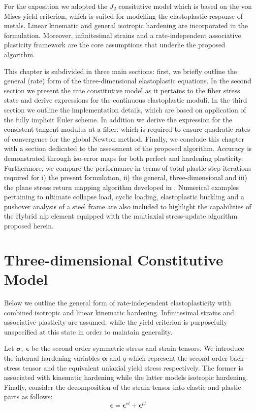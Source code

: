 For the exposition we adopted the $J_2$ consitutive model which is based on the 
von Mises yield criterion, which is suited for modelling the elastoplastic 
response of metals. Linear kinematic and general isotropic hardening are 
incorporated in the formulation. Moreover, infinitesimal strains and a 
rate-independent associative plasticity framework are the core assumptions that 
underlie the proposed algorithm. 

This chapter is subdivided in three main 
sections: first, we briefly outline the general (rate) form of the 
three-dimensional elastoplastic equations. In the second section we present the 
rate constitutive model as it pertains to the fiber stress state and derive 
expressions for the continuous elastoplastic moduli. In the third 
section we outline the implementation details, which are based on application 
of the fully implicit Euler scheme. In addition we derive the expression for 
the consistent tangent modulus at a fiber, which is required to ensure 
quadratic rates of convergence for the global Newton method. Finally, we 
conclude this chapter with a section dedicated to the assessment of the 
proposed algorithm. Accuracy is demonstrated through iso-error maps for both 
perfect and hardening plasticity. Furthermore, we compare the performance in 
terms of total plastic step iterations required for i) the present formulation, 
ii) the general, three-dimensional and iii) the plane stress return mapping 
algorithm developed in \cite{Simo1986}. Numerical examples pertaining to 
ultimate collapse load, cyclic loading, elastoplastic buckling and a pushover 
analysis of a steel frame are also included to highlight the capabilities of 
the Hybrid \acrshort{nlp} element equipped with the multiaxial stress-update 
algorithm proposed herein.


\section{Three-dimensional Constitutive Model}\label{section:CH3-S2}
Below we outline the general form of rate-independent elastoplasticity 
with combined isotropic and linear kinematic hardening. Infinitesimal strains 
and associative plasticity are assumed, while the yield criterion is 
purposefully unspecified at this state in order to maintain generality. 

Let $\bm{\sigma},\ \bm{\epsilon}$ be the second order symmetric stress and 
strain tensors. We introduce the internal hardening variables $\bm{\alpha}$ and 
$q$ which represent the second order back-stress tensor and the equivalent 
uniaxial yield stress respectively. The former is associated with kinematic 
hardening while the latter models isotropic hardening. Finally, consider the 
decomposition of the strain tensor into elastic and plastic parts as follows:
\begin{equation}
	\bm{\epsilon} = \bm{\epsilon}^{el} + \bm{\epsilon}^{pl}
	\label{eq:DECOMP_STRAIN}
\end{equation} 


